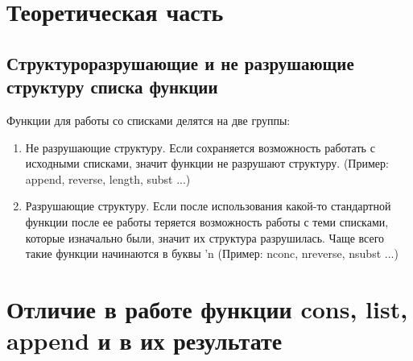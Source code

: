 \documentclass[a4paper,oneside,12pt]{extreport}
\begin{document}
\begin{task}
		

		

		
\end{task}



\newpage

\section*{Теоретическая часть}

\subsection*{Структуроразрушающие и не разрушающие структуру списка функции}

Функции для работы со списками делятся на две группы:

\begin{enumerate}
    \item Не разрушающие структуру. Если сохраняется возможность работать с исходными списками, значит функции не разрушают структуру.
    (Пример: append, reverse, length, subst ...)
    \item Разрушающие структуру. 
    Если после использования какой-то стандартной функции после ее работы теряется 
    возможность работы с теми списками, которые изначально были, значит их структура разрушилась. 
    Чаще всего такие функции начинаются в буквы 'n (Пример: nconc, nreverse, nsubst ...)
\end{enumerate}

\section*{Отличие в работе функции cons, list, append и в их результате}
\end{document}
